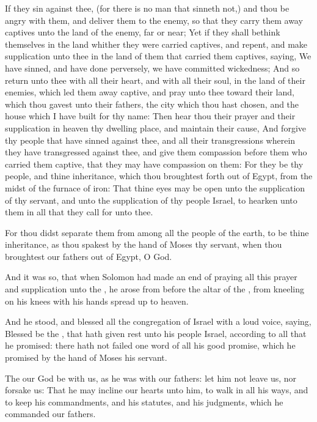 \verse If they sin against thee, (for there is no man that sinneth not,) and thou be angry with them, and deliver them to the enemy, so that they carry them away captives unto the land of the enemy, far or near; \verse Yet if they shall bethink themselves in the land whither they were carried captives, and repent, and make supplication unto thee in the land of them that carried them captives, saying, We have sinned, and have done perversely, we have committed wickedness; \verse And so return unto thee with all their heart, and with all their soul, in the land of their enemies, which led them away captive, and pray unto thee toward their land, which thou gavest unto their fathers, the city which thou hast chosen, and the house which I have built for thy name: \verse Then hear thou their prayer and their supplication in heaven thy dwelling place, and maintain their cause, \verse And forgive thy people that have sinned against thee, and all their transgressions wherein they have transgressed against thee, and give them compassion before them who carried them captive, that they may have compassion on them: \verse For they be thy people, and thine inheritance, which thou broughtest forth out of Egypt, from the midst of the furnace of iron: \verse That thine eyes may be open unto the supplication of thy servant, and unto the supplication of thy people Israel, to hearken unto them in all that they call for unto thee.

\verse For thou didst separate them from among all the people of the earth, to be thine inheritance, as thou spakest by the hand of Moses thy servant, when thou broughtest our fathers out of Egypt, O \LORD God.

\verse And it was so, that when Solomon had made an end of praying all this prayer and supplication unto the \LORD, he arose from before the altar of the \LORD, from kneeling on his knees with his hands spread up to heaven.

\verse And he stood, and blessed all the congregation of Israel with a loud voice, saying, \verse Blessed be the \LORD, that hath given rest unto his people Israel, according to all that he promised: there hath not failed one word of all his good promise, which he promised by the hand of Moses his servant.

\verse The \LORD our God be with us, as he was with our fathers: let him not leave us, nor forsake us: \verse That he may incline our hearts unto him, to walk in all his ways, and to keep his commandments, and his statutes, and his judgments, which he commanded our fathers.

